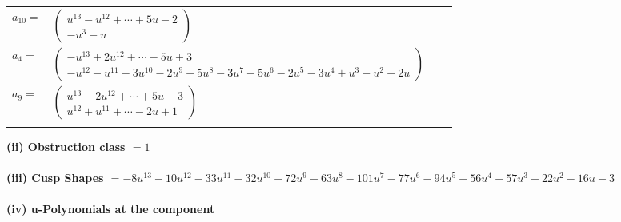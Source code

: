 \documentclass[1p]{elsarticle_modified}
\theoremstyle{definition}
\begin{document}
\begin{tabular}{m{7pt} m{180pt} m{7pt} m{180pt} }
\flushright $a_{10}=$&$\begin{pmatrix}u^{13}- u^{12}+\cdots+5 u-2\\- u^3- u\end{pmatrix}$ \\
\flushright $a_{4}=$&$\begin{pmatrix}- u^{13}+2 u^{12}+\cdots-5 u+3\\- u^{12}- u^{11}-3 u^{10}-2 u^9-5 u^8-3 u^7-5 u^6-2 u^5-3 u^4+u^3- u^2+2 u\end{pmatrix}$ \\
\flushright $a_{9}=$&$\begin{pmatrix}u^{13}-2 u^{12}+\cdots+5 u-3\\u^{12}+u^{11}+\cdots-2 u+1\end{pmatrix}$\\&\end{tabular}
\flushleft \textbf{(ii) Obstruction class $= 1$}\\~\\
\flushleft \textbf{(iii) Cusp Shapes $= -8 u^{13}-10 u^{12}-33 u^{11}-32 u^{10}-72 u^9-63 u^8-101 u^7-77 u^6-94 u^5-56 u^4-57 u^3-22 u^2-16 u-3$}\\~\\
\newpage\renewcommand{\arraystretch}{1}
\flushleft \textbf{(iv) u-Polynomials at the component}\newline \\
\end{document}
